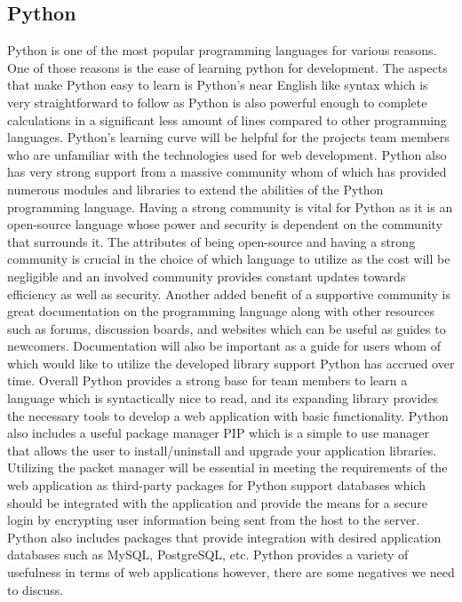 \documentclass[onecolumn, draftclsnofoot,10pt, compsoc]{IEEEtran}
\begin{document}
\subsection{Python}
Python is one of the most popular programming languages for various reasons. One of those reasons is the ease of learning python for development. The aspects that make Python easy to learn is Python's near English like syntax which is very straightforward to follow as Python is also powerful enough to complete calculations in a significant less amount of lines compared to other programming languages. Python’s learning curve will be helpful for the projects team members who are unfamiliar with the technologies used for web development. Python also has very strong support from a massive community whom of which has provided numerous modules and libraries to extend the abilities of the Python programming language. Having a strong community is vital for Python as it is an open-source language whose power and security is dependent on the community that surrounds it. The attributes of being open-source and having a strong community is crucial in the choice of which language to utilize as the cost will be negligible and an involved community provides constant updates towards efficiency as well as security. Another added benefit of a supportive community is great documentation on the programming language along with other resources such as forums, discussion boards, and websites which can be useful as guides to newcomers. Documentation will also be important as a guide for users whom of which would like to utilize the developed library support Python has accrued over time. Overall Python provides a strong base for team members to learn a language which is syntactically nice to read, and its expanding library provides the necessary tools to develop a web application with basic functionality. Python also includes a useful package manager PIP which is a simple to use manager that allows the user to install/uninstall and upgrade your application libraries. Utilizing the packet manager will be essential in meeting the requirements of the web application as third-party packages for Python support databases which should be integrated with the application and provide the means for a secure login by encrypting user information being sent from the host to the server.  Python also includes packages that provide integration with desired application databases such as MySQL, PostgreSQL, etc. Python provides a variety of usefulness in terms of web applications however, there are some negatives we need to discuss.\\
\end{document}
